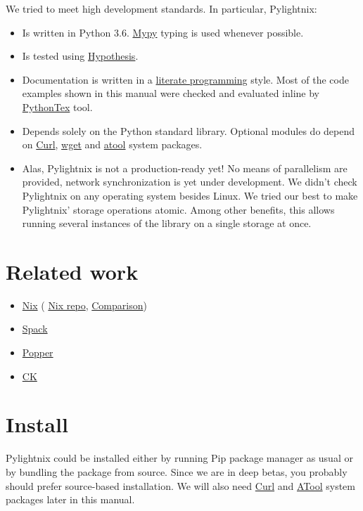 \documentclass{article}
\begin{document}
We tried to meet high development standards. In particular, Pylightnix:
\begin{itemize}
  \item Is written in Python 3.6. \href{http://mypy-lang.org/}{Mypy} typing is
    used whenever possible.
  \item Is tested using \href{https://pypi.org/project/hypothesis/}{Hypothesis}.
  \item Documentation is written in a
    \href{https://en.wikipedia.org/wiki/Literate_programming}{literate
    programming} style. Most of the code examples shown in this manual were
    checked and evaluated inline by
    \href{https://github.com/gpoore/pythontex}{PythonTex} tool.
  \item Depends solely on the Python standard library. Optional modules
    do depend on \href{https://curl.se/}{Curl},
    \href{https://www.gnu.org/software/wget/}{wget} and
    \href{https://www.nongnu.org/atool/}{atool} system packages.
  \item Alas, Pylightnix is not a production-ready yet! No means of parallelism
    are provided, network synchronization is yet under development.  We didn't
    check Pylightnix on any operating system besides Linux. We tried our best
    to make Pylightnix' storage operations atomic. Among other benefits,
    this allows running several instances of the library on a single
    storage at once.
\end{itemize}

\section{Related work}

\begin{itemize}
  \item \href{https://nixos.org}{Nix} (
    \href{https://github.com/nixos/nix}{Nix repo},
    \href{./Comparison.md#Pylightnix-vs-Nix}{Comparison})
  \item \href{https://spack.io}{Spack}
  \item \href{https://falsifiable.us}{Popper}
  \item \href{https://cknowledge.org}{CK}
\end{itemize}

\section{Install}

Pylightnix could be installed either by running Pip package manager as usual or
by bundling the package from source. Since we are in deep betas, you probably
should prefer source-based installation. We will also need
\href{https://curl.se/}{Curl} and \href{https://www.nongnu.org/atool/}{ATool}
system packages later in this manual.
\end{document}
